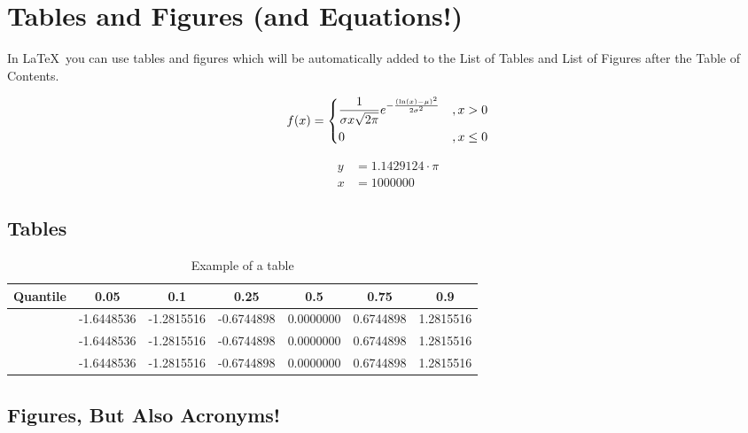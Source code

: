 \documentclass[seminarpaper, grey, english]{mas-thesis-sections}   %
\begin{document}
\section{Tables and Figures (and Equations!)}

In \LaTeX\ you can use tables and figures which will be automatically added to the List of Tables and List of Figures after the Table of Contents.

\begin{equation*}
        f(x) = 
        \begin{dcases}
            \frac{1}{\sigma x \sqrt{2 \pi}} e^{ - \frac{(\ln(x) - \mu)^2}{2 \sigma^2}} & , x > 0 \\
            0 & , x \leq 0
        \end{dcases}
\end{equation*}

\begin{align}
	y &= 1.1429124 \cdot \pi \\
	x &= 1000000
\end{align}

\subsection{Tables}

\begin{table}[ht]
\begin{center}
        \begin{tabular}{
            S[table-column-width=10mm]
            S[table-format=-1.6]
            S[table-format=-1.6]
            S[table-format=-1.6]
            S[table-format=-1.6]
            S[table-format=-1.6]
            S[table-format=-1.6]}
            \toprule
            {Quantile} & 0.05 & 0.1 & 0.25 & 0.5 & 0.75 & 0.9 \\ 
            \midrule
             & -1.6448536 & -1.2815516 & -0.6744898 & 0.0000000 & 0.6744898 & 1.2815516 \\ 
             & -1.6448536 & -1.2815516 & -0.6744898 & 0.0000000 & 0.6744898 & 1.2815516 \\ 
             & -1.6448536 & -1.2815516 & -0.6744898 & 0.0000000 & 0.6744898 & 1.2815516 \\ 
             \bottomrule
        \end{tabular}
	\caption{Example of a table}
	\label{table:1}
\end{center}
\end{table}

\subsection{Figures, But Also Acronyms!}
\end{document}
